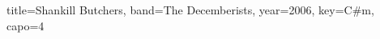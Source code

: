 \documentclass{skrul-leadsheet}
\begin{document}
\begin{song}[transpose-capo=true]{title={Shankill Butchers}, band={The Decemberists}, year={2006}, key={C#m}, capo={4}}



\end{song}
\end{document}
